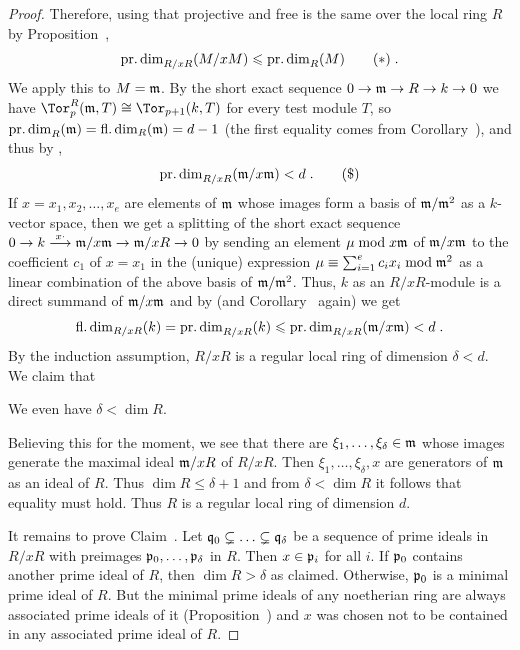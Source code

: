 \documentclass[a4paper,parskip=half,numbers=enddot, DIV=12]{scrreprt}
\renewcommand{\leq}{\leqslant}
\begin{document}
\begin{proof}
	Therefore, using that projective and free is the same over the local ring $R$ by Proposition~,
	\begin{align}\lbl{eq:pdimOfM/xMandM}
		\pdim_{R/xR}(M/xM)\leq \pdim_R(M)\tag{$*$}\;.
	\end{align}
	We apply this to $M=\mathfrak{m}$. By the short exact sequence $0\morphism\mm\morphism R\morphism k\morphism 0$ we have $\Tor_p^R(\mm,T)\cong\Tor_{p+1}(k,T)$ for every test module $T$, so $\operatorname{pr.dim}_R(\mathfrak{m})=\operatorname{fl.dim}_R(\mathfrak{m})=d-1$ (the first equality comes from Corollary~), and thus by ,
	\begin{align}\lbl{eq:pdimIneq2}
		\pdim_{R/xR}(\mm/x\mm)<d\;.\tag{\$}
	\end{align}
	If $x=x_1,x_2,\ldots,x_e$ are elements of $\mathfrak{m}$ whose images form a basis of $\mathfrak{m}/\mathfrak{m}^2$ as a $k$-vector space, then we get a splitting of the short exact sequence $0\morphism k\morphism[x\cdot ]\mm/x\mm\morphism\mm/xR\morphism 0$
	by sending an element $\mu\bmod x\mathfrak{m}$ of $\mathfrak{m}/x\mathfrak{m}$ to the coefficient $c_1$ of $x=x_1$ in the (unique) expression $\mu\equiv\sum_{i=1}^ec_ix_i\bmod\mathfrak{m}^2$ as a linear combination of the above basis of $\mathfrak{m}/\mathfrak{m}^2$. Thus, $k$ as an $R/xR$-module is a direct summand of $\mathfrak{m}/x\mathfrak{m}$ and by  (and Corollary~ again) we get
	\begin{align*}
		\fdim_{R/xR}(k)= \pdim_{R/xR}(k)\leq \pdim_{R/xR}(\mm/x\mm)<d\;.
	\end{align*}
	By the induction assumption, $R/xR$ is a regular local ring of dimension $\delta<d$. We claim that
	\begin{claim}
		We even have $\delta<\dim R$.
	\end{claim}
	Believing this for the moment, we see that there are $\xi_1,\ldots,\xi_\delta\in\mathfrak{m}$ whose images generate the maximal ideal $\mathfrak{m}/xR$ of $R/xR$. Then $\xi_1,\ldots,\xi_\delta,x$ are generators of $\mathfrak{m}$ as an ideal of $R$. Thus $\dim R\leq \delta+1$ and from $\delta<\dim R$ it follows that equality must hold. Thus $R$ is a regular local ring of dimension $d$.
	
	It remains to prove Claim~. Let $\mathfrak{q}_0\subsetneq\ldots\subsetneq\mathfrak{q}_\delta$ be a sequence of prime ideals in $R/xR$ with preimages $\mathfrak{p}_0,\ldots,\mathfrak{p}_\delta$ in $R$. Then $x\in\mathfrak{p}_i$ for all $i$. If $\mathfrak{p}_0$ contains another prime ideal of $R$, then $\dim R>\delta$ as claimed. Otherwise, $\mathfrak{p}_0$ is a minimal prime ideal of $R$. But the minimal prime ideals of any noetherian ring are always associated prime ideals of it (Proposition~) and $x$ was chosen not to be contained in any associated prime ideal of $R$.
\end{proof}
\end{document}
